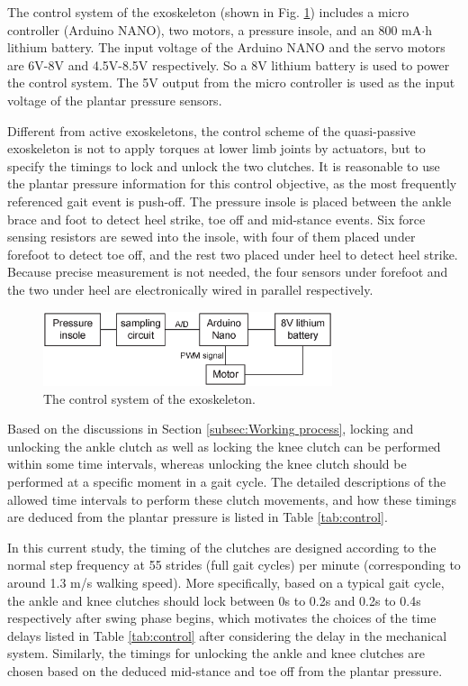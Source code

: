 \documentclass[twocolumn,cleanfoot,10pt]{asme2ej}
\begin{document}
The control system of the exoskeleton (shown in Fig. \ref{fig:control}) includes a micro controller (Arduino NANO), two motors, a pressure insole, and an 800 mA$\cdot$h lithium battery.
The input voltage of the Arduino NANO and the servo motors are 6V-8V and 4.5V-8.5V respectively.
So a 8V lithium battery is used to power the control system.
The 5V output from the micro controller is used as the input voltage of the plantar pressure sensors. 

Different from active exoskeletons, the control scheme of the quasi-passive exoskeleton is not to apply torques at lower limb joints by actuators, but to specify the timings to lock and unlock the two clutches.
It is reasonable to use the plantar pressure information for this control objective, as the most frequently referenced gait event is push-off.
The pressure insole is placed between the ankle brace and foot to detect heel strike, toe off and mid-stance events.
Six force sensing resistors are sewed into the insole, with four of them placed under forefoot to detect toe off, and the rest two placed under heel to detect heel strike.
Because precise measurement is not needed, the four sensors under forefoot and the two under heel are electronically wired in parallel respectively. 

\begin{figure}[t]
	\centering
	\includegraphics[width=8.5cm]{control.eps}
	\caption{The control system of the exoskeleton.}
	\label{fig:control}   
\end{figure}

Based on the discussions in Section \ref{subsec:Working process}, locking and unlocking the ankle clutch as well as locking the knee clutch can be performed within some time intervals, whereas unlocking the knee clutch should be performed at a specific moment in a gait cycle.
The detailed descriptions of the allowed time intervals to perform these clutch movements, and how these timings are deduced from the plantar pressure is listed in Table \ref{tab:control}.

In this current study, the timing of the clutches are designed according to the normal step frequency at 55 strides (full gait cycles) per minute (corresponding to around 1.3 m/s walking speed).
More specifically, based on a typical gait cycle, the ankle and knee clutches should lock between 0s to 0.2s and 0.2s to 0.4s respectively after swing phase begins, which motivates the choices of the time delays listed in Table \ref{tab:control} after considering the delay in the mechanical system.
Similarly, the timings for unlocking the ankle and knee clutches are chosen based on the deduced mid-stance and toe off from the plantar pressure.
\end{document}
